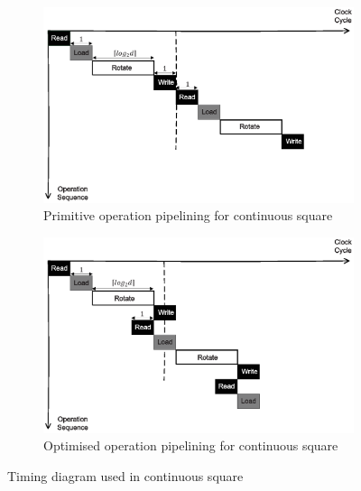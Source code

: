 \documentclass[runningheads]{llncs}
\begin{document}
\begin{figure}[!tb]
\centering
\begin{subfigure}[t]{0.45\textwidth}\centering
\includegraphics[width=\textwidth]{./fig/pipeline_square.eps}
\caption{Primitive operation pipelining for continuous square}
\label{fig:pipeline_squ}
\end{subfigure}
\hspace{1em}
\begin{subfigure}[t]{0.45\textwidth}\centering
\includegraphics[width=\textwidth]{./fig/pipeline_square2.eps}
\caption{Optimised operation pipelining for continuous square }
\label{fig:pipeline_squ2}
\end{subfigure}
\caption{Timing diagram used in continuous square}
\end{figure}
\end{document}
